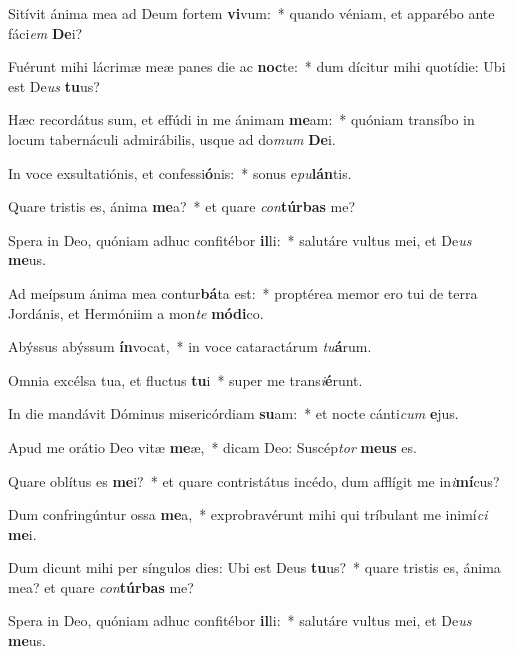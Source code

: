 \item Sitívit ánima mea ad Deum fortem \textbf{vi}vum:~* quando véniam, et apparébo ante fáci\textit{em} \textbf{De}i?
\item Fuérunt mihi lácrimæ meæ panes die ac \textbf{noc}te:~* dum dícitur mihi quotídie: Ubi est De\textit{us} \textbf{tu}us?
\item Hæc recordátus sum, et effúdi in me ánimam \textbf{me}am:~* quóniam transíbo in locum tabernáculi admirábilis, usque ad do\textit{mum} \textbf{De}i.
\item In voce exsultatiónis, et confessi\textbf{ó}nis:~* sonus e\textit{pu}\textbf{lán}tis.
\item Quare tristis es, ánima \textbf{me}a?~* et quare \textit{con}\textbf{túr}\textbf{bas} me?
\item Spera in Deo, quóniam adhuc confitébor \textbf{il}li:~* salutáre vultus mei, et De\textit{us} \textbf{me}us.
\item Ad meípsum ánima mea contur\textbf{bá}ta est:~* proptérea memor ero tui de terra Jordánis, et Hermóniim a mon\textit{te} \textbf{mó}\textbf{di}co.
\item Abýssus abýssum \textbf{ín}vocat,~* in voce cataractárum \textit{tu}\textbf{á}rum.
\item Omnia excélsa tua, et fluctus \textbf{tu}i~* super me trans\textit{i}\textbf{é}runt.
\item In die mandávit Dóminus misericórdiam \textbf{su}am:~* et nocte cánti\textit{cum} \textbf{e}jus.
\item Apud me orátio Deo vitæ \textbf{me}æ,~* dicam Deo: Suscép\textit{tor} \textbf{me}\textbf{us} es.
\item Quare oblítus es \textbf{me}i?~* et quare contristátus incédo, dum afflígit me in\textit{i}\textbf{mí}cus?
\item Dum confringúntur ossa \textbf{me}a,~* exprobravérunt mihi qui tríbulant me inimí\textit{ci} \textbf{me}i.
\item Dum dicunt mihi per síngulos dies: Ubi est Deus \textbf{tu}us?~* quare tristis es, ánima mea? et quare \textit{con}\textbf{túr}\textbf{bas} me?
\item Spera in Deo, quóniam adhuc confitébor \textbf{il}li:~* salutáre vultus mei, et De\textit{us} \textbf{me}us.
